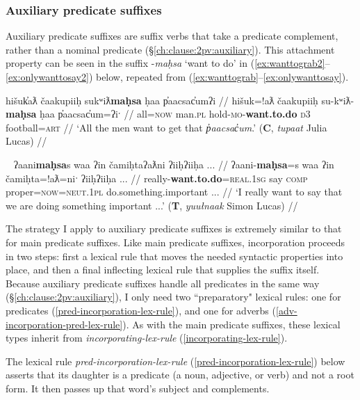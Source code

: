\subsubsection{Auxiliary predicate suffixes} \label{ch:clause:analysis:auxpred}

Auxiliary predicate suffixes are suffix verbs that take a predicate complement, rather than a nominal predicate (\S\ref{ch:clause:2pv:auxiliary}). This attachment property can be seen in the suffix -\textit{maḥsa} `want to do' in (\ref{ex:wanttograb2}--\ref{ex:onlywanttosay2}) below, repeated from (\ref{ex:wanttograb}--\ref{ex:onlywanttosay}).

\ex \label{ex:wanttograb2}
\begingl
\glpreamble hišuk̓aƛ čaakupiiḥ sukʷiƛ\textbf{maḥsa} ḥaa p̓aacsac̓umʔi //
\gla hišuk=!aƛ čaakupiiḥ su-kʷiƛ-\textbf{maḥsa} ḥaa p̓aacsac̓um=ʔiˑ //
\glb all=\textsc{now} man.\textsc{pl} hold-\textsc{mo}-\textbf{want.to.do} \textsc{d3} football\footnotemark=\textsc{art} //
\glft `All the men want to get that \textit{p̓aacsac̓um}.' (\textbf{C}, \textit{tupaat} Julia Lucas) //
\endgl
\xe

\ex~ \label{ex:onlywanttosay2}
\begingl
\glpreamble ʔaani\textbf{maḥsa}s waa ʔin čamiḥtaʔaƛni ʔiiḥʔiiḥa ... //
\gla ʔaani-\textbf{maḥsa}=s waa ʔin čamiḥta=!aƛ=niˑ ʔiiḥʔiiḥa ... //
\glb really-\textbf{want.to.do}=\textsc{real.1sg} say \textsc{comp} proper=\textsc{now}=\textsc{neut.1pl} do.something.important ... //
\glft `I really want to say that we are doing something important ...' (\textbf{T}, \textit{yuułnaak} Simon Lucas) //
\endgl
\xe

The strategy I apply to auxiliary predicate suffixes is extremely similar to that for main predicate suffixes. Like main predicate suffixes, incorporation proceeds in two steps: first a lexical rule that moves the needed syntactic properties into place, and then a final inflecting lexical rule that supplies the suffix itself. Because auxiliary predicate suffixes handle all predicates in the same way (\S\ref{ch:clause:2pv:auxiliary}), I only need two ``preparatory" lexical rules: one for predicates (\ref{pred-incorporation-lex-rule}), and one for adverbs (\ref{adv-incorporation-pred-lex-rule}). As with the main predicate suffixes, these lexical types inherit from {\textit{incorporating-lex-rule}} (\ref{incorporating-lex-rule}).

The lexical rule \textit{pred-incorporation-lex-rule} (\ref{pred-incorporation-lex-rule}) below asserts that its daughter is a predicate (a noun, adjective, or verb) and not a root form. It then passes up that word's subject and complements.

